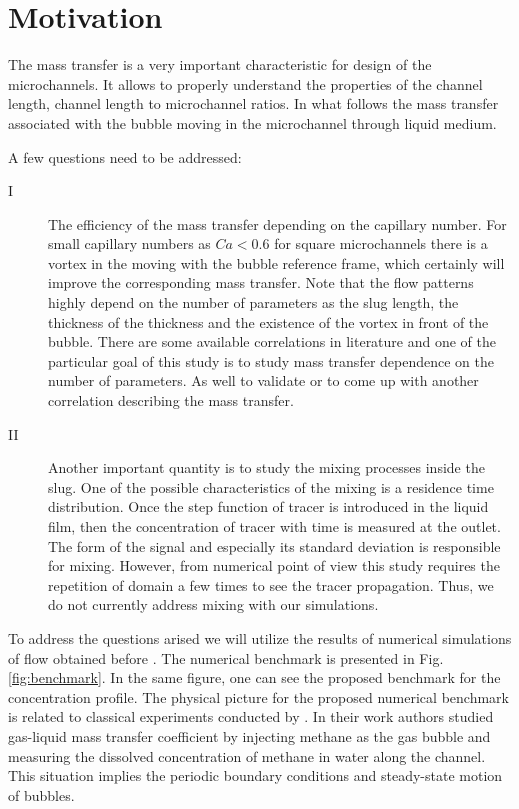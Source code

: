 \documentclass{article}
\begin{document}
\section{Motivation}
The mass transfer is a very important characteristic for design of the microchannels. It allows to
properly understand the properties of the channel length, channel length to microchannel ratios. In
what follows the mass transfer associated with the bubble moving in the microchannel through liquid
medium. 

A few questions need to be addressed:
\begin{description}
 \item[I] The efficiency of the mass transfer depending on the capillary number. For small capillary
numbers as $Ca<0.6$ for square microchannels there is a vortex in the moving with the bubble
reference frame, which certainly will improve the corresponding mass transfer. Note that the flow
patterns highly depend on the number of parameters as the slug length, the thickness of the
thickness and the existence of the vortex in front of the bubble. There are some available
correlations in literature \cite{bercic-mass,kreutzer-overview} and one of the particular goal of
this study is to study mass transfer dependence on the number of parameters. As well to validate or
to come up with another correlation describing the mass transfer.

 \item[II] Another important quantity is to study the mixing processes inside the slug. One of the
possible characteristics of the mixing is a residence time distribution. Once the step function
of tracer is introduced in the liquid film, then the concentration of tracer with time is
measured at the outlet. The form of the signal and especially its standard deviation is responsible
for mixing. However, from numerical point of view this study requires the repetition of domain a
few times to see the tracer propagation. Thus, we do not currently address mixing with our
simulations.
\end{description}

To address the questions arised we will utilize the results of numerical simulations of flow
obtained
before \cite{kuzmin-binary2d}. The numerical benchmark is presented in Fig. \ref{fig:benchmark}. In
the same figure, one can see the proposed benchmark for the concentration profile. The physical
picture for the proposed numerical benchmark is  related to classical experiments conducted by
\citet{bercic-mass}. In their work authors studied gas-liquid mass transfer coefficient by
injecting methane as the gas bubble and measuring the dissolved concentration of methane in water
along the channel. This situation implies the periodic boundary conditions and steady-state motion
of bubbles.  
\end{document}
